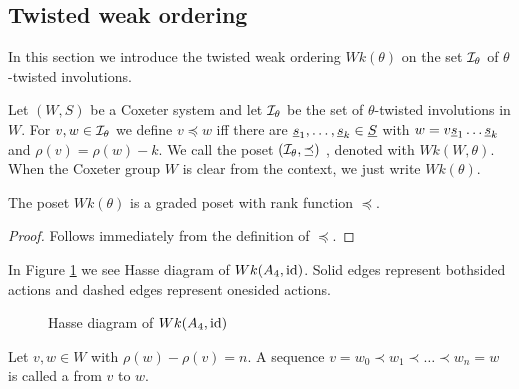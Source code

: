 \subsection{Twisted weak ordering}
\label{sec:twisted-involutions-twisted-weak-ordering}

In this section we introduce the twisted weak ordering $Wk(\theta)$ on the set $\mathcal{I}_{\theta}$ of $\theta$-twisted involutions.

\begin{defi}
	Let $(W,S)$ be a Coxeter system and let $\mathcal{I}_{\theta}$ be the set of $\theta$-twisted involutions in $W$. For $v,w \in \mathcal{I}_{\theta}$ we define $v \preceq w$ iff there are $\underline{s}_1, \ldots, \underline{s}_k \in \underline{S}$ with $w = v \underline{s}_1 \ldots \underline{s}_k$ and $\rho(v) = \rho(w) - k$. We call the poset $(\mathcal{I}_{\theta},\preceq)$ , denoted with $Wk(W, \theta)$. When the Coxeter group $W$ is clear from the context, we just write $Wk(\theta)$.
\end{defi}

\begin{lemm}
	The poset $Wk(\theta)$ is a graded poset with rank function $\preceq$.

	\begin{proof}
		Follows immediately from the definition of $\preceq$.
	\end{proof}
\end{lemm}

\begin{exam}
	In Figure \ref{fig:a4} we see Hasse diagram of $Wk(A_4, \operatorname{id})$. Solid edges represent bothsided actions and dashed edges represent onesided actions.
	\begin{figure}[ht]
		\centering
		
		\caption{Hasse diagram of $Wk(A_4, \operatorname{id})$}
		\label{fig:a4}
	\end{figure}
\end{exam}

\begin{defi}
	Let $v,w \in W$ with $\rho(w) - \rho(v) = n$. A sequence $v = w_0 \prec w_1 \prec \ldots \prec w_n = w$ is called a  from $v$ to $w$.
\end{defi}

\todo